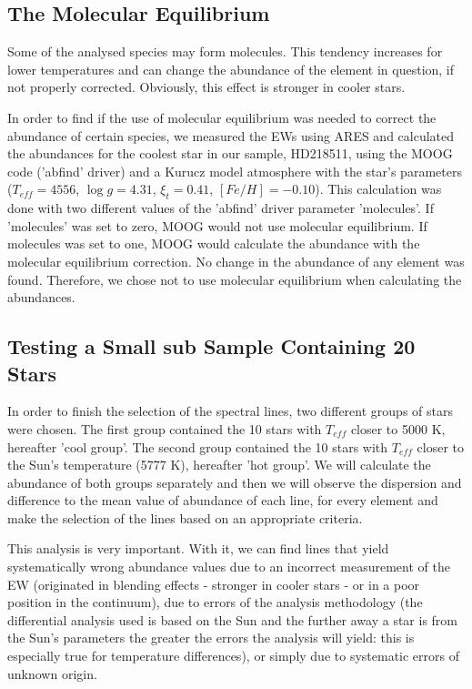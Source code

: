 \documentclass[dvips,12pt,a4paper]{report}
\begin{document}
{\subsection {The Molecular Equilibrium}

Some of the analysed species may form molecules. This tendency increases for lower temperatures and can change the abundance of the element in question, if not properly corrected. Obviously, this effect is stronger in cooler stars.

In order to find if the use of molecular equilibrium was needed to correct the abundance of certain species, we measured the EWs using ARES and calculated the abundances for the coolest star in our sample, HD218511, using the MOOG code ('abfind' driver) and a Kurucz model atmosphere with the star's parameters ($T_{eff}=4556$, $\log g=4.31$, $\xi_t=0.41$, $[Fe/H]=-0.10$).  This calculation was done with two different values of the 'abfind' driver parameter 'molecules'. If 'molecules' was set to zero, MOOG would not use molecular equilibrium. If molecules was set to one, MOOG would calculate the abundance with the molecular equilibrium correction. No change in the abundance of any element was found. Therefore, we chose not to use molecular equilibrium when calculating the abundances.

\subsection {Testing a Small sub Sample Containing 20 Stars} 
\label{20stars}
In order to finish the selection of the spectral lines, two different groups of stars were chosen. The first group contained the 10 stars with $T_{eff}$ closer to 5000 K, hereafter 'cool group'. The second group contained the 10 stars with $T_{eff}$ closer to the Sun's temperature (5777 K), hereafter 'hot group'. We will calculate the abundance of both groups separately and then we will observe the dispersion and difference to the mean value of abundance of each line, for every element and make the selection of the lines based on an appropriate criteria. %

This analysis is very important. With it, we can find lines that yield systematically wrong abundance values due to an incorrect measurement of the EW (originated in blending effects - stronger in cooler stars - or in a poor position in the continuum), due to errors of the analysis methodology (the differential analysis used is based on the Sun and the further away a star is from the Sun's parameters the greater the errors the analysis will yield: this is especially true for temperature differences), or simply due to systematic errors of unknown origin.

}
\end{document}
